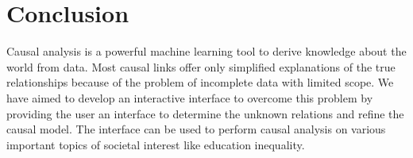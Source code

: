 \documentclass{vgtc}                          %
\begin{document}
\section{Conclusion}

Causal analysis is a powerful machine learning tool to derive knowledge about the world from data. Most causal links offer only simplified explanations of the true relationships because of the problem of incomplete data with limited scope. We have aimed to develop an interactive interface to overcome this problem by providing the user an interface to determine the unknown relations and refine the causal model. The interface can be used to perform causal analysis on various important topics of societal interest like education inequality.


% 

%
%
%
\end{document}
